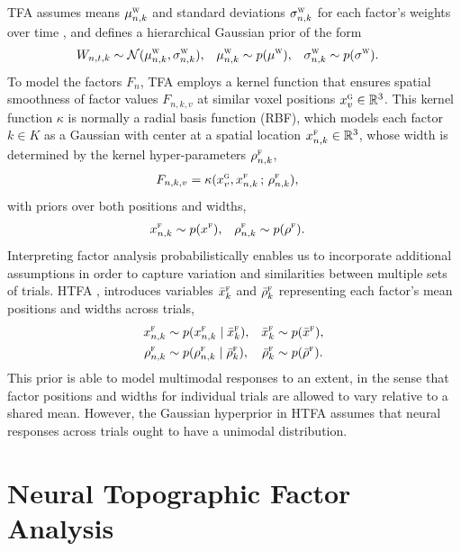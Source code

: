 \documentclass[twoside]{article}
\newcommand{\scf}{\textsc{f}}
\newcommand{\scg}{\textsc{g}}
\newcommand{\scw}{\textsc{w}}
\begin{document}
TFA assumes means $\mu^\textsc{w}_{n,k}$ and standard deviations $\sigma^\textsc{w}_{n,k}$ for each factor's weights over time , and defines a hierarchical Gaussian prior of the form
\begin{align*}
	W_{n,t,k}
    &\sim 
    \mathcal{N}(\mu^\scw_{n,k}, \sigma^\scw_{n,k}),
    &
	\mu^\scw_{n,k}
   	&\sim 
    p(\mu^\scw),
    &
	\sigma^\scw_{n,k} 
   	&\sim 
    p(\sigma^\scw).
\end{align*}
To model the factors $F_n$, TFA employs a kernel function that ensures spatial smoothness of factor values $F_{n,k,v}$ at similar voxel positions $x^\scg_v \in \mathbb{R}^3$. This kernel function $\kappa$ is normally a radial basis function (RBF), which models each factor $k\in K$ as a Gaussian with center at a spatial location $x_{n,k}^\scf \in \mathbb{R}^3$, whose width is determined by the kernel hyper-parameters $\rho^\scf_{n,k}$, 
\begin{align}
	\label{eq:tfa-factor-kernel}
	F_{n,k,v}
    &= 
    \kappa(x^\scg_v, x^\scf_{n,k} \,;\, \rho^\scf_{n,k})
    ,
\end{align}
with priors over both positions and widths,
\begin{align}
	x^\scf_{n,k} 
    &\sim 
    p(x^\scf),
    &   
	\rho^\scf_{n,k} 
    &\sim 
    p(\rho^\scf).
\end{align}
Interpreting factor analysis probabilistically enables us to incorporate additional assumptions in order to capture variation and similarities between multiple sets of trials. HTFA \citep{manning2014hierarchical,manning2018probabilistic}, introduces variables $\bar{x}^\scf_k$ and $\bar{\rho}^\scf_k$ representing each factor's mean positions and widths across trials, 
\begin{align} 
    x^\scf_{n,k} 
    &\sim 
    p(x^\scf_{n,k} \mid \bar{x}^\scf_{k})
    ,
    &
    \bar{x}^\scf_{k} 
    &\sim
    p(\bar{x}^\scf)
    ,
    \\
    \rho^\scf_{n,k} 
    &\sim 
    p(\rho^\scf_{n,k} \mid \bar{\rho}^\scf_{k})
    ,
    &
    \bar{\rho}^\scf_{k} 
    &\sim
    p(\bar{\rho}^\scf).
\end{align}
This prior is able to model multimodal responses to an extent, in the sense that factor positions and widths for individual trials are allowed to vary relative to a shared mean. However, the Gaussian hyperprior in HTFA assumes that neural responses across trials ought to have a unimodal distribution.

\vspace{-1.0em}
\section{Neural Topographic Factor Analysis}
\vspace{-1.0em}
\label{sec:ntfa-basic}
\end{document}
